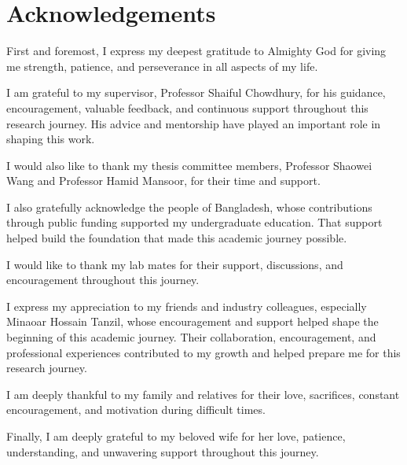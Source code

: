 \chapter*{Acknowledgements}

First and foremost, I express my deepest gratitude to Almighty God for giving me strength, patience, and perseverance in all aspects of my life.

I am grateful to my supervisor, Professor Shaiful Chowdhury, for his guidance, encouragement, valuable feedback, and continuous support throughout this research journey. His advice and mentorship have played an important role in shaping this work.

I would also like to thank my thesis committee members, Professor Shaowei Wang and Professor Hamid Mansoor, for their time and support.

I also gratefully acknowledge the people of Bangladesh, whose contributions through public funding supported my undergraduate education. That support helped build the foundation that made this academic journey possible.

I would like to thank my lab mates for their support, discussions, and encouragement throughout this journey.

I express my appreciation to my friends and industry colleagues, especially Minaoar Hossain Tanzil, whose encouragement and support helped shape the beginning of this academic journey. Their collaboration, encouragement, and professional experiences contributed to my growth and helped prepare me for this research journey.

I am deeply thankful to my family and relatives for their love, sacrifices, constant encouragement, and motivation during difficult times.

Finally, I am deeply grateful to my beloved wife for her love, patience, understanding, and unwavering support throughout this journey.